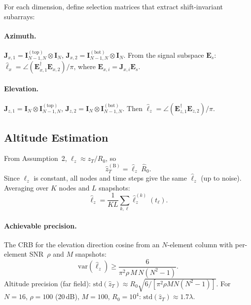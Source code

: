 \documentclass[11pt,a4paper]{article}
\begin{document}
For each dimension, define selection matrices that extract
shift-invariant subarrays:

\paragraph{Azimuth.}
$\mathbf{J}_{x,1}=\mathbf{I}_{N-1,N}^{(\mathrm{top})}\otimes
\mathbf{I}_N$,\;
$\mathbf{J}_{x,2}=\mathbf{I}_{N-1,N}^{(\mathrm{bot})}\otimes
\mathbf{I}_N$.
From the signal subspace $\mathbf{E}_s$:
$\hat{\ell}_x=\angle(\mathbf{E}_{x,1}^\dagger\mathbf{E}_{x,2})/\pi$,
where $\mathbf{E}_{x,i}=\mathbf{J}_{x,i}\mathbf{E}_s$.

\paragraph{Elevation.}
$\mathbf{J}_{z,1}=\mathbf{I}_N\otimes
\mathbf{I}_{N-1,N}^{(\mathrm{top})}$,\;
$\mathbf{J}_{z,2}=\mathbf{I}_N\otimes
\mathbf{I}_{N-1,N}^{(\mathrm{bot})}$.
Then
$\hat{\ell}_z=\angle(\mathbf{E}_{z,1}^\dagger\mathbf{E}_{z,2})/\pi$.

\subsection{Altitude Estimation}
\label{sec:altitude}

From Assumption~2, $\ell_z\approx z_T/R_0$, so
\begin{equation}
  \boxed{\hat{z}_T^{(\mathrm{B})}
  =\hat{\ell}_z\;\hat{R}_0.}
  \label{eq:zT_est}
\end{equation}
Since $\ell_z$ is constant, all nodes and time steps give the same
$\hat{\ell}_z$ (up to noise).  Averaging over $K$ nodes and $L$
snapshots:
\begin{equation}
  \hat{\ell}_z=\frac{1}{KL}\sum_{k,\ell}
  \hat{\ell}_z^{(k)}(t_\ell).
  \label{eq:lz_avg}
\end{equation}

\paragraph{Achievable precision.}
The CRB for the elevation direction cosine from an $N$-element
column with per-element SNR~$\rho$ and $M$ snapshots:
\begin{equation}
  \mathrm{var}(\hat{\ell}_z)\ge
  \frac{6}{\pi^2\rho\,M\,N(N^2{-}1)}.
  \label{eq:crb}
\end{equation}
Altitude precision (far field):
$\mathrm{std}(\hat{z}_T)\approx R_0
\sqrt{6/[\pi^2\rho MN(N^2{-}1)]}$.
For $N{=}16$, $\rho{=}100$ (20\,dB), $M{=}100$, $R_0{=}10^4$:
$\mathrm{std}(\hat{z}_T)\approx 1.7\lambda$.
\end{document}
